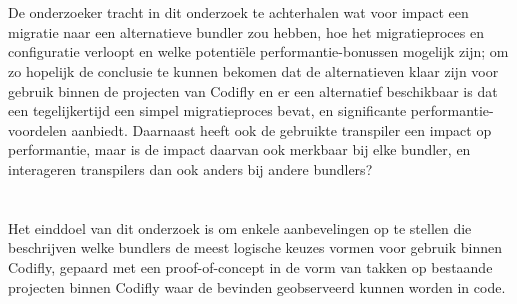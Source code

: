 \section{}
\label{sec:onderzoeksvraag}

De onderzoeker tracht in dit onderzoek te achterhalen wat voor impact een migratie naar een alternatieve bundler zou hebben, hoe het migratieproces en configuratie verloopt en welke potentiële performantie-bonussen mogelijk zijn; om zo hopelijk de conclusie te kunnen bekomen dat de alternatieven klaar zijn voor gebruik binnen de projecten van Codifly en er een alternatief beschikbaar is dat een tegelijkertijd een simpel migratieproces bevat, en significante performantie-voordelen aanbiedt. Daarnaast heeft ook de gebruikte transpiler een impact op performantie, maar is de impact daarvan ook merkbaar bij elke bundler, en interageren transpilers dan ook anders bij andere bundlers?


\section{}
\label{sec:onderzoeksdoelstelling}

Het einddoel van dit onderzoek is om enkele aanbevelingen op te stellen die beschrijven welke bundlers de meest logische keuzes vormen voor gebruik binnen Codifly, gepaard met een proof-of-concept in de vorm van takken op bestaande projecten binnen Codifly waar de bevinden geobserveerd kunnen worden in code.


\section{}
\label{sec:opzet-bachelorproef}

